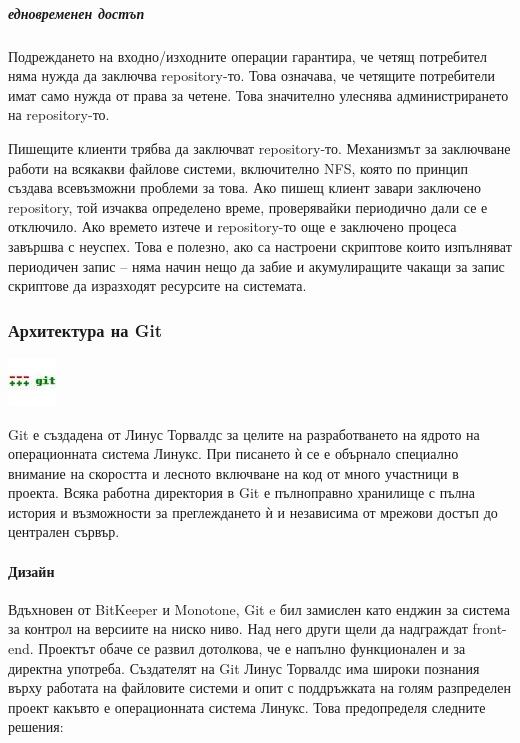 \documentclass[a4paper]{article}
\begin{document}
      \subparagraph{едновременен достъп}
      Подреждането на входно/изходните операции гарантира, че четящ потребител няма нужда да заключва repository-то. Това означава, че четящите потребители имат само нужда от права за четене. Това значително улеснява администрирането на repository-то.

      Пишещите клиенти трябва да заключват repository-то. Механизмът за
      заключване работи на всякакви файлове системи, включително NFS\cite{nfs},
      която по принцип създава всевъзможни проблеми за това. Ако пишещ клиент
      завари заключено repository, той изчаква определено време, проверявайки
      периодично дали се е отключило. Ако времето изтече и repository-то още
      е заключено процеса завършва с неуспех. Това е полезно, ако са настроени
      скриптове които изпълняват периодичен запис -- няма начин нещо да забие
      и акумулиращите чакащи за запис скриптове да изразходят ресурсите на
      системата.

    \subsubsection{Архитектура на Git}
    \includegraphics[scale=1.0]{git_icon}

    Git е създадена от Линус Торвалдс за целите на разработването на ядрото на операционната система Линукс. При писането ѝ се е обърнало специално внимание на скоростта и лесното включване на код от много участници в проекта. Всяка работна директория в Git е пълноправно хранилище с пълна история и възможности за преглеждането ѝ и независима от мрежови достъп до централен сървър.
  
    \paragraph{Дизайн}

    Вдъхновен от BitKeeper и Monotone, Git e бил замислен като енджин за система за контрол на версиите на ниско ниво. Над него други щели да надграждат front-end. Проектът обаче се развил дотолкова, че е напълно функционален и за директна употреба. Създателят на Git Линус Торвалдс има широки познания върху работата на файловите системи и опит с поддръжката на голям разпределен проект какъвто е операционната система Линукс. Това предопределя следните решения:
\end{document}
